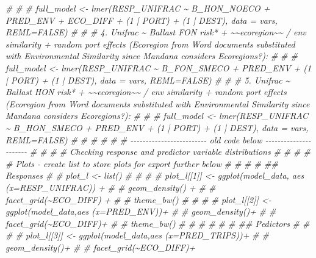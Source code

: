 \documentclass[
]{article}
\newenvironment{Shaded}{\begin{snugshade}}{\end{snugshade}}
\newcommand{\CommentTok}[1]{\textcolor[rgb]{0.56,0.35,0.01}{\textit{#1}}}
\begin{document}
\begin{Shaded}
\begin{Highlighting}[]
\CommentTok{\# }
\CommentTok{\# \# full\_model <{-} lmer(RESP\_UNIFRAC \textasciitilde{} B\_HON\_NOECO + PRED\_ENV + ECO\_DIFF + (1 | PORT) + (1 | DEST), data = vars, REML=FALSE)}
\CommentTok{\# }
\CommentTok{\# \#\textquotesingle{} 4.  \textasciigrave{}Unifrac \textasciitilde{} Ballast FON risk* + \textasciitilde{}\textasciitilde{}ecoregion\textasciitilde{}\textasciitilde{} / env similarity + random port effects\textasciigrave{} (Ecoregion from Word documents substituted with Environmental Similarity since Mandana considers Ecoregions?):}
\CommentTok{\# }
\CommentTok{\# \# full\_model <{-} lmer(RESP\_UNIFRAC \textasciitilde{} B\_FON\_SMECO + PRED\_ENV + (1 | PORT) + (1 | DEST), data = vars, REML=FALSE)}
\CommentTok{\# }
\CommentTok{\# \#\textquotesingle{} 5.  \textasciigrave{}Unifrac \textasciitilde{} Ballast HON risk* + \textasciitilde{}\textasciitilde{}ecoregion\textasciitilde{}\textasciitilde{} / env similarity + random port effects\textasciigrave{} (Ecoregion from Word documents substituted with Environmental Similarity since Mandana considers Ecoregions?):}
\CommentTok{\# }
\CommentTok{\# \# full\_model <{-} lmer(RESP\_UNIFRAC \textasciitilde{} B\_HON\_SMECO + PRED\_ENV + (1 | PORT) + (1 | DEST), data = vars, REML=FALSE)}
\CommentTok{\# }
\CommentTok{\# \#\textquotesingle{}}
\CommentTok{\# }
\CommentTok{\# \# {-}{-}{-}{-}{-}{-}{-}{-}{-}{-}{-}{-}{-}{-}{-}{-}{-}{-}{-}{-}{-}{-}{-}{-}{-} old code below {-}{-}{-}{-}{-}{-}{-}{-}{-}{-}{-}{-}{-}{-}{-}{-}{-}{-}{-}{-}{-}{-}}
\CommentTok{\# \# }
\CommentTok{\# \# Checking response and predictor variable distributions}
\CommentTok{\# \# }
\CommentTok{\# \# \# Plots {-}  create list to store plots for export further below}
\CommentTok{\# \# }
\CommentTok{\# \# \#\# Responses}
\CommentTok{\# \# plot\_l <{-} list()}
\CommentTok{\# \# }
\CommentTok{\# \# plot\_l[[1]] <{-} ggplot(model\_data, aes (x=RESP\_UNIFRAC)) + }
\CommentTok{\# \#               geom\_density() +}
\CommentTok{\# \#               facet\_grid(\textasciitilde{}ECO\_DIFF) +}
\CommentTok{\# \#               theme\_bw()}
\CommentTok{\# \# }
\CommentTok{\# \# plot\_l[[2]] <{-} ggplot(model\_data,aes (x=PRED\_ENV))+ }
\CommentTok{\# \#               geom\_density()+}
\CommentTok{\# \#               facet\_grid(\textasciitilde{}ECO\_DIFF)+}
\CommentTok{\# \#               theme\_bw()}
\CommentTok{\# \# }
\CommentTok{\# \# }
\CommentTok{\# \# \#\# Pedictors}
\CommentTok{\# \# }
\CommentTok{\# \# plot\_l[[3]] <{-}  ggplot(model\_data,aes (x=PRED\_TRIPS))+ }
\CommentTok{\# \#                geom\_density()+}
\CommentTok{\# \#                facet\_grid(\textasciitilde{}ECO\_DIFF)+}

\end{Highlighting}
\end{Shaded}
\end{document}

